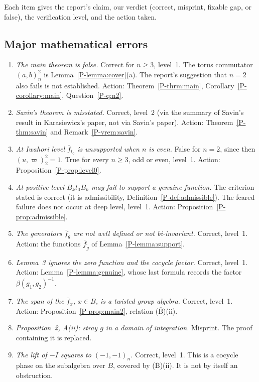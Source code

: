 \documentclass[12pt,letterpaper]{amsart}
\newcommand{\fbar}{\overline{f}}
\begin{document}
Each item gives the report's claim, our verdict (correct, misprint,
fixable gap, or false), the verification level, and the action taken.

\subsection*{Major mathematical errors}
\begin{enumerate}[leftmargin=1.5em]
\item \emph{The main theorem is false.} Correct for $n\geq 3$, level~1.
The torus commutator $(a,b)_n^2$ is Lemma~\ref{P-lemma:cover}(a). The
report's suggestion that $n=2$ also fails is not established. Action:
Theorem~\ref{P-thrm:main}, Corollary~\ref{P-corollary:main},
Question~\ref{P-q:n2}.
\item \emph{Savin's theorem is misstated.} Correct, level~2 (via the
summary of Savin's result in Karasiewicz's paper, not via Savin's
paper). Action: Theorem~\ref{P-thm:savin} and
Remark~\ref{P-vrem:savin}.
\item \emph{At Iwahori level $\fbar_{t_0}$ is unsupported when $n$ is
even.} False for $n=2$, since then $(u,\varpi)_2^2=1$. True for every
$n\geq 3$, odd or even, level~1. Action:
Proposition~\ref{P-prop:level0}.
\item \emph{At positive level $B_kt_0B_k$ may fail to support a genuine
function.} The criterion stated is correct (it is admissibility,
Definition~\ref{P-def:admissible}). The feared failure does not occur
at deep level, level~1. Action: Proposition~\ref{P-prop:admissible}.
\item \emph{The generators $\fbar_g$ are not well defined or not
bi-invariant.} Correct, level~1. Action: the functions
$\fbar_{\tilde g}$ of Lemma~\ref{P-lemma:support}.
\item \emph{Lemma~3 ignores the zero function and the cocycle
factor.} Correct, level~1. Action: Lemma~\ref{P-lemma:genuine}, whose
last formula records the factor $\beta(g_1,g_2)^{-1}$.
\item \emph{The span of the $\fbar_x$, $x\in B$, is a twisted group
algebra.} Correct, level~1. Action: Proposition~\ref{P-prop:main2},
relation ($\overline{\mathrm{B}}$)(ii).
\item \emph{Proposition~2, A(ii): stray $g$ in a domain of
integration.} Misprint. The proof containing it is replaced.
\item \emph{The lift of $-I$ squares to $(-1,-1)_n$.} Correct, level~1.
This is a cocycle phase on the subalgebra over $B$, covered by
($\overline{\mathrm{B}}$)(ii). It is not by itself an obstruction.
\end{enumerate}
\end{document}
